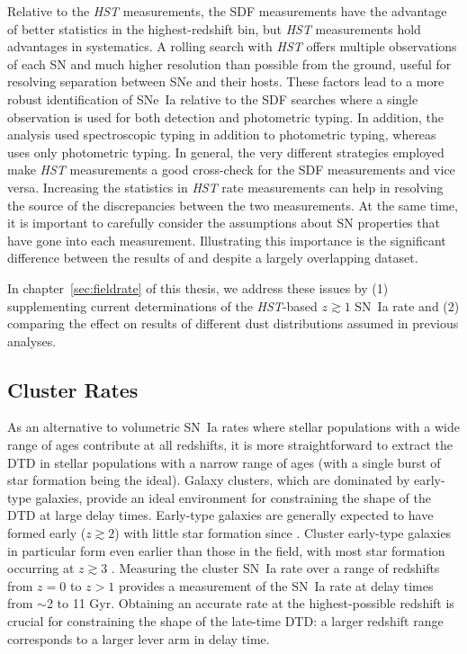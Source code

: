 Relative to the \emph{HST} measurements, the SDF measurements have the
advantage of better statistics in the highest-redshift bin,
but \emph{HST} measurements hold advantages in systematics.  A rolling
search with \emph{HST} offers multiple observations of each SN and
much higher resolution than possible from the ground, useful for
resolving separation between SNe and their hosts. These factors lead
to a more robust identification of SNe~Ia relative to the SDF searches
where a single observation is used for both detection and photometric
typing. In addition, the \citet{dahlen08a} analysis used spectroscopic
typing in addition to photometric typing, whereas \citet{graur11a}
uses only photometric typing. In general, the very different
strategies employed make \emph{HST} measurements a good cross-check
for the SDF measurements and vice versa. Increasing the statistics
in \emph{HST} rate measurements can help in resolving the source of
the discrepancies between the two measurements. At the same time, it
is important to carefully consider the assumptions about SN properties
that have gone into each measurement. Illustrating this importance is
the significant difference between the results
of \citet{kuznetsova08a} and \citet{dahlen08a} despite a largely
overlapping dataset.

In chapter~\ref{sec:fieldrate} of this thesis, we address these issues
by (1) supplementing current determinations of the \emph{HST}-based $z
\gtrsim 1$ SN~Ia rate and (2) comparing the effect on results of
different dust distributions assumed in previous analyses.


\subsection{Cluster Rates}

As an alternative to volumetric SN~Ia rates where stellar populations
with a wide range of ages contribute at all redshifts, it is more
straightforward to extract the DTD in stellar populations with a
narrow range of ages (with a single burst of star formation being the
ideal). Galaxy clusters, which are dominated by early-type galaxies,
provide an ideal environment for constraining the shape of the DTD at
large delay times. Early-type galaxies are generally expected to have
formed early ($z \gtrsim 2$) with little star formation since
\citep{stanford98a,vandokkum01a}. Cluster early-type galaxies in
particular form even earlier than those in the field, with most star
formation occurring at $z \gtrsim 3$
\citep{thomas05a,sanchezblazquez06a,gobat08a}.  Measuring the cluster
SN~Ia rate over a range of redshifts from $z=0$ to $z>1$ provides a
measurement of the SN~Ia rate at delay times from $\sim$2 to 11
Gyr. Obtaining an accurate rate at the highest-possible redshift is
crucial for constraining the shape of the late-time DTD: a larger
redshift range corresponds to a larger lever arm in delay time.

